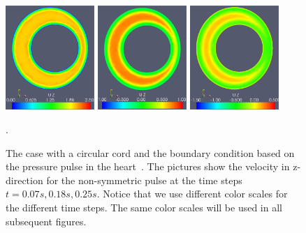 \begin{figure}\begin{center}
\includegraphics[width=0.3\textwidth]{chapters/hentschel/pdf/pulse_f1_08_sysmax_nmb7.pdf}
\includegraphics[width=0.3\textwidth]{chapters/hentschel/pdf/pulse_f1_08_sysdia_nmb18.pdf}
\includegraphics[width=0.3\textwidth]{chapters/hentschel/pdf/pulse_f1_08_diamin1_nmb25.pdf}
\caption{The case with a circular cord and the boundary condition based on
the pressure pulse in the heart~\citep{SmithChase2ShawEtAl2006}. 
The pictures show the velocity in z-direction for the non-symmetric pulse at the time steps $t=0.07s, 0.18s, 0.25s$. Notice that we use different color scales for the different time steps. The same color scales
will be used in all subsequent figures. }
\label{fig:case1}.
\end{center}\end{figure}


